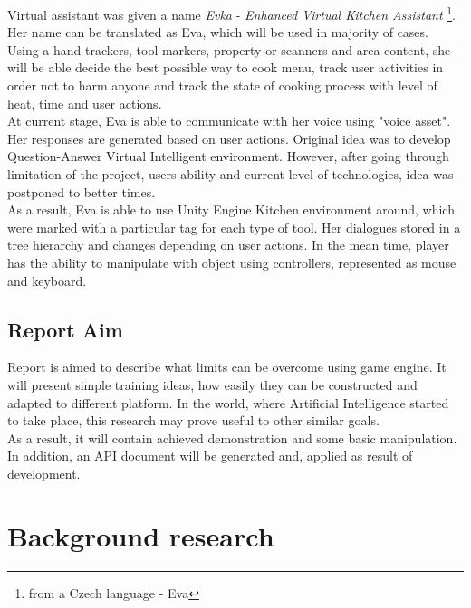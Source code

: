 \documentclass[18pt]{article}
\numberwithin{equation}{section} %
\numberwithin{figure}{section} %
\numberwithin{table}{section} %
\begin{document}
		Virtual assistant was given a name \textit{Evka} - \textit{Enhanced Virtual Kitchen Assistant} \footnote{from a Czech language - Eva}. Her name can be translated as Eva, which will be used in majority of cases. Using a hand trackers, tool markers, property or scanners and area content, she will be able decide the best possible way to cook menu, track user activities in order not to harm anyone and track the state of cooking process with level of heat, time and user actions. \\	
		
		At current stage, Eva is able to communicate with her voice using "voice asset". Her responses are generated based on user actions. Original idea was to develop Question-Answer Virtual Intelligent environment. However, after going through limitation of the project, users ability and current level of technologies, idea was postponed to better times. \\	
		
		As a result, Eva is able to use Unity Engine Kitchen environment around, which were marked with a particular tag for each type of tool. Her dialogues stored in a tree hierarchy and changes depending on user actions. In the mean time, player has the ability to manipulate with object using controllers, represented as mouse and keyboard. \\
		
	\subsection{Report Aim}
		Report is aimed to describe what limits can be overcome using game engine. It will present simple training ideas, how easily they can be constructed and adapted to different platform. In the world, where Artificial Intelligence started to take place, this research may prove useful to other similar goals.\\
		
		As a result, it will contain achieved demonstration and some basic manipulation. In addition, an API document will be generated and, applied as result of development. \\
	
\section{Background research}	
\end{document}
